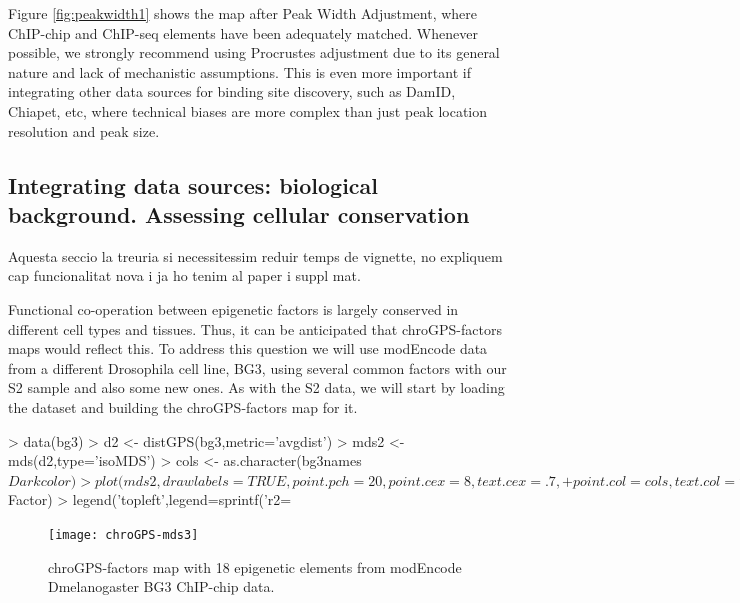\documentclass[a4paper,12pt,nogin]{article}
\newcommand{\newtext}[1]{{\color{blue} #1}} %
\newcommand{\drcomment}[1]{{\color{red} #1}} %
\begin{document}
\newtext{
Figure \ref{fig:peakwidth1} shows the map after Peak Width Adjustment,
where ChIP-chip and ChIP-seq elements have been adequately matched.
}
Whenever possible, we strongly recommend using Procrustes adjustment
due to its general nature and lack of 
\newtext{mechanistic} assumptions. This is
even more important if integrating other data sources for binding
site discovery, such as DamID, Chiapet, etc, where technical biases
are more complex than just peak location resolution and peak size.
 
\subsection{Integrating data sources: biological background. Assessing
cellular conservation}
\label{ssec:biobias}

\drcomment{Aquesta seccio la treuria si necessitessim reduir temps de vignette, no expliquem cap funcionalitat nova i ja ho tenim al paper i suppl mat.}

Functional co-operation between epigenetic factors is largely
conserved in different cell types and tissues. Thus, it can be
anticipated that chroGPS-factors maps would reflect this. To address
this question we will use modEncode data from a different Drosophila
cell line, BG3, using several common factors with our S2 sample and
also some new ones. As with the S2 data, we will start by loading the dataset and building the chroGPS-factors map for it.
 
\footnotesize
 
\begin{Schunk}
\begin{Sinput}
> data(bg3)
> d2 <- distGPS(bg3,metric='avgdist')
> mds2 <- mds(d2,type='isoMDS')
> cols <- as.character(bg3names$Darkcolor)
> plot(mds2,drawlabels=TRUE,point.pch=20,point.cex=8,text.cex=.7,
+ point.col=cols,text.col='white',labels=bg3names$Factor)
> legend('topleft',legend=sprintf('r2=%
\end{Sinput}
\end{Schunk}
 
\normalsize
 
\begin{figure}
\begin{center}
\texttt{[image: chroGPS-mds3]}
\end{center}
\caption{chroGPS-factors map with 18 epigenetic elements from modEncode Dmelanogaster BG3 ChIP-chip data.}
\label{fig:mds3}
\end{figure}
 
\end{document}
